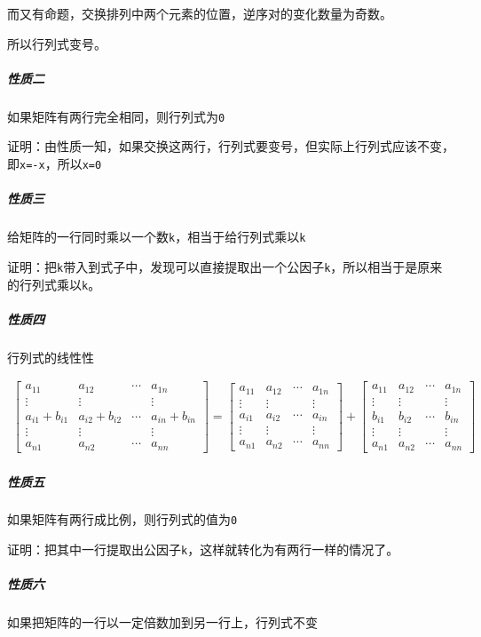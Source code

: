 \documentclass[UTF-8]{ctexart}
\begin{document}
	而又有命题，交换排列中两个元素的位置，逆序对的变化数量为奇数。  
	
	所以行列式变号。
	
	\subparagraph{性质二} 如果矩阵有两行完全相同，则行列式为\texttt{0}
	
	证明：由性质一知，如果交换这两行，行列式要变号，但实际上行列式应该不变，即\texttt{x=-x}，所以\texttt{x=0}
	
	\subparagraph{性质三} 给矩阵的一行同时乘以一个数\texttt{k}，相当于给行列式乘以\texttt{k}
	
	证明：把\texttt{k}带入到式子中，发现可以直接提取出一个公因子\texttt{k}，所以相当于是原来的行列式乘以\texttt{k}。
	
	\subparagraph{性质四} 行列式的线性性
	
	\begin{align}
	\begin{bmatrix} a _ {11} & a _ {12} & \cdots & a _ {1n} \\ \vdots & \vdots &  & \vdots \\ a _ {i1}+b _ {i1} & a _ {i2}+b _ {i2} & \cdots & a _ {in}+b _ {in} \\ \vdots & \vdots &  & \vdots \\ a _ {n1} & a _ {n2} & \cdots & a _ {nn} \end{bmatrix} = \begin{bmatrix} a _ {11} & a _ {12} & \cdots & a _ {1n} \\ \vdots & \vdots &  & \vdots \\ a _ {i1} & a _ {i2} & \cdots & a _ {in} \\ \vdots & \vdots &  & \vdots \\ a _ {n1} & a _ {n2} & \cdots & a _ {nn} \end{bmatrix} + \begin{bmatrix} a _ {11} & a _ {12} & \cdots & a _ {1n} \\ \vdots & \vdots &  & \vdots \\ b _ {i1} & b _ {i2} & \cdots & b _ {in} \\ \vdots & \vdots &  & \vdots \\ a _ {n1} & a _ {n2} & \cdots & a _ {nn} \end{bmatrix}\nonumber
	\end{align}
	
	\subparagraph{性质五} 如果矩阵有两行成比例，则行列式的值为\texttt{0}
	
	证明：把其中一行提取出公因子\texttt{k}，这样就转化为有两行一样的情况了。
	
	\subparagraph{性质六} 如果把矩阵的一行以一定倍数加到另一行上，行列式不变
	
\end{document}
